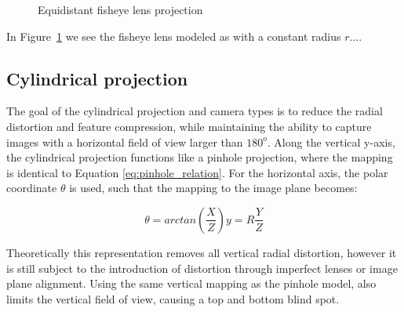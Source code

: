 \begin{figure}[!htb]
    
    \caption{Equidistant fisheye lens projection}
    \label{fig:fisheye_spherical_projection}
\end{figure}

In Figure~\ref{fig:fisheye_spherical_projection} we see the fisheye lens modeled as with a constant radius $r$....

\subsection{Cylindrical projection}

The goal of the cylindrical projection and camera types is to reduce the radial distortion and feature compression, while maintaining the ability to capture images with a horizontal field of view larger than $180^o$. Along the vertical y-axis, the cylindrical projection functions like a pinhole projection, where the mapping is identical to Equation \eqref{eq:pinhole_relation}. For the horizontal axis, the polar coordinate $\theta$ is used, such that the mapping to the image plane becomes:

\begin{subequations}
\begin{equation}
    \theta = arctan\left(\frac{X}{Z}\right)
    \label{eq:cylindrical_theta}
\end{equation}
\begin{equation}
    y = R\frac{Y}{Z}
    \label{eq:cylindrical_y}
\end{equation}
\label{eq:cylindrical}
\end{subequations}

Theoretically this representation removes all vertical radial distortion, however it is still subject to the introduction of distortion through imperfect lenses or image plane alignment. Using the same vertical mapping as the pinhole model, also limits the vertical field of view, causing a top and bottom blind spot.

